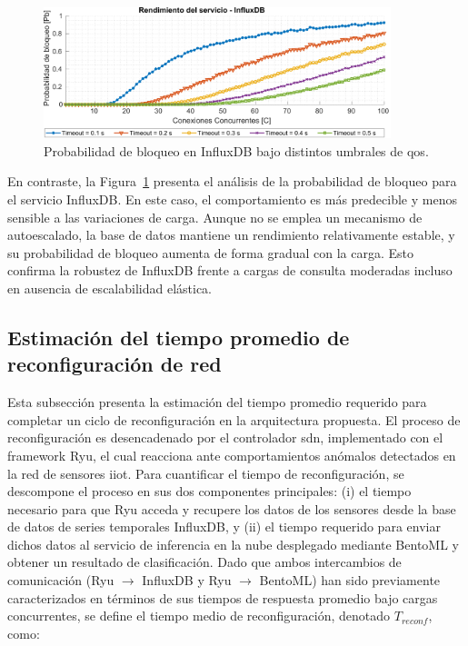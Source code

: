 \begin{figure}[ht!]
    \centering
    \includegraphics[width=0.9\textwidth]{fig/08_datadriven/datadriven_15.pdf}
    \caption{Probabilidad de bloqueo en InfluxDB bajo distintos umbrales de \gls{qos}.}
    \label{fig:hey-blocking-test-influx}
\end{figure}

En contraste, la Figura~\ref{fig:hey-blocking-test-influx} presenta el análisis de la probabilidad de bloqueo para el servicio InfluxDB. En este caso, el comportamiento es más predecible y menos sensible a las variaciones de carga. Aunque no se emplea un mecanismo de autoescalado, la base de datos mantiene un rendimiento relativamente estable, y su probabilidad de bloqueo aumenta de forma gradual con la carga. Esto confirma la robustez de InfluxDB frente a cargas de consulta moderadas incluso en ausencia de escalabilidad elástica.


\subsection{Estimación del tiempo promedio de reconfiguración de red}

Esta subsección presenta la estimación del tiempo promedio requerido para completar un ciclo de reconfiguración en la arquitectura propuesta. El proceso de reconfiguración es desencadenado por el controlador \gls{sdn}, implementado con el framework Ryu, el cual reacciona ante comportamientos anómalos detectados en la red de sensores \gls{iiot}. Para cuantificar el tiempo de reconfiguración, se descompone el proceso en sus dos componentes principales: (i) el tiempo necesario para que Ryu acceda y recupere los datos de los sensores desde la base de datos de series temporales InfluxDB, y (ii) el tiempo requerido para enviar dichos datos al servicio de inferencia en la nube desplegado mediante BentoML y obtener un resultado de clasificación. Dado que ambos intercambios de comunicación (Ryu $\rightarrow$ InfluxDB y Ryu $\rightarrow$ BentoML) han sido previamente caracterizados en términos de sus tiempos de respuesta promedio bajo cargas concurrentes, se define el tiempo medio de reconfiguración, denotado $T_{reconf}$, como:

